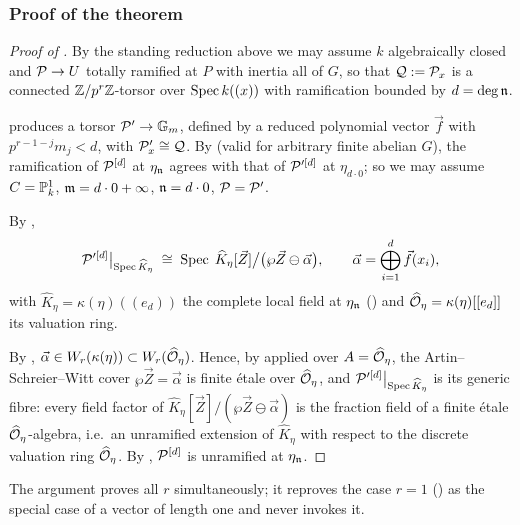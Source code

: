 \subsubsection*{Proof of the theorem}

\begin{proof}[Proof of ]
    By the standing reduction above we may assume $k$ algebraically closed and
    $\mathcal{P} \to U$ totally ramified at $P$ with inertia all of $G$, so that
    $\mathcal{Q} := \mathcal{P}_x$ is a connected $\mathbb{Z}/p^r\mathbb{Z}$-torsor over $\operatorname{Spec} k((x))$ with
    ramification bounded by $d = \deg \mathfrak{n}$.

     produces a torsor $\mathcal{P}' \to \mathbb{G}_m$, defined
    by a reduced polynomial vector $\vec f$ with $p^{r-1-j} m_j < d$, with
    $\mathcal{P}'_x \cong \mathcal{Q}$. By  (valid for arbitrary finite
    abelian $G$), the ramification of $\mathcal{P}^{[d]}$ at $\eta_{\mathfrak{n}}$ agrees with that of
    $\mathcal{P}'^{[d]}$ at $\eta_{d \cdot 0}$; so we may assume $C = \mathbb{P}^1_k$,
    $\mathfrak{m} = d \cdot 0 + \infty$, $\mathfrak{n} = d \cdot 0$, $\mathcal{P} = \mathcal{P}'$.

    By ,
    \[
    \mathcal{P}'^{[d]}\big|_{\operatorname{Spec} \widehat K_\eta}
    \;\cong\;
    \operatorname{Spec}\; \widehat K_\eta[\vec Z]\big/\bigl(\wp \vec Z \ominus \vec \alpha\bigr),
    \qquad
    \vec \alpha = \bigoplus_{i=1}^{d} \vec f(x_i),
    \]
    with $\widehat K_\eta = \kappa(\eta)((e_d))$ the complete local field at
    $\eta_{\mathfrak{n}}$ () and
    $\widehat{\mathcal{O}}_\eta = \kappa(\eta)[[e_d]]$ its valuation ring.

    By ,
    $\vec \alpha \in W_r(\kappa(\eta)) \subset W_r(\widehat{\mathcal{O}}_\eta)$. Hence, by
     applied over $A = \widehat{\mathcal{O}}_\eta$, the
    Artin--Schreier--Witt cover $\wp \vec Z = \vec \alpha$ is finite \'etale over
    $\widehat{\mathcal{O}}_\eta$, and $\mathcal{P}'^{[d]}\big|_{\operatorname{Spec} \widehat K_\eta}$ is its generic
    fibre: every field factor of
    $\widehat K_\eta[\vec Z]/(\wp \vec Z \ominus \vec \alpha)$ is the fraction field
    of a finite \'etale $\widehat{\mathcal{O}}_\eta$-algebra, i.e.\ an unramified extension of
    $\widehat K_\eta$ with respect to the discrete valuation ring
    $\widehat{\mathcal{O}}_\eta$. By ,
    $\mathcal{P}^{[d]}$ is unramified at $\eta_{\mathfrak{n}}$.
\end{proof}

\begin{rem*}
    The argument proves all $r$ simultaneously; it reproves the case $r=1$
    () as the special case of a
    vector of length one and never invokes it.
\end{rem*}

